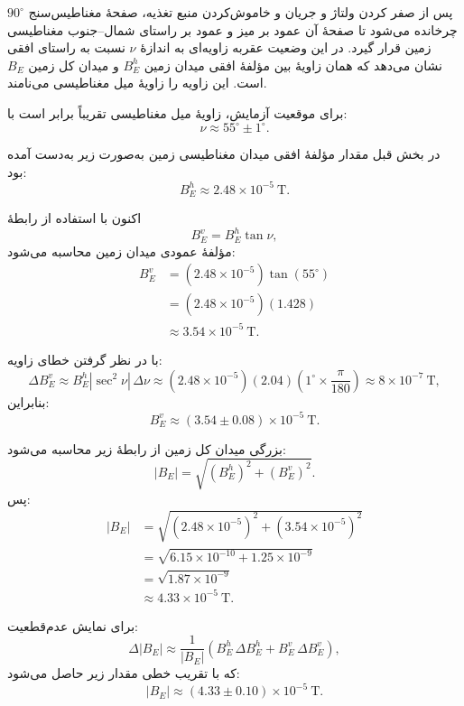 \documentclass[a4paper, 11pt]{article}
\begin{document}
پس از صفر کردن ولتاژ و جریان و خاموش‌کردن منبع تغذیه، صفحهٔ مغناطیس‌سنج
\(90^\circ\) چرخانده می‌شود تا صفحهٔ آن عمود بر میز و عمود بر راستای
شمال–جنوب مغناطیسی زمین قرار گیرد. در این وضعیت عقربه زاویه‌ای به اندازهٔ
\(\nu\) نسبت به راستای افقی نشان می‌دهد که همان زاویهٔ بین مؤلفهٔ افقی
میدان زمین \(B_E^h\) و میدان کل زمین \(B_E\) است. این زاویه را زاویهٔ
میل مغناطیسی می‌نامند.

برای موقعیت آزمایش، زاویهٔ میل مغناطیسی تقریباً برابر است با:
\begin{equation}
\nu \approx 55^\circ \pm 1^\circ.
\end{equation}

در بخش قبل مقدار مؤلفهٔ افقی میدان مغناطیسی زمین به‌صورت زیر به‌دست آمده بود:
\begin{equation}
B_E^h \approx 2.48\times 10^{-5}\ \mathrm{T}.
\end{equation}

اکنون با استفاده از رابطهٔ
\[
B_E^v = B_E^h \tan\nu,
\]
مؤلفهٔ عمودی میدان زمین محاسبه می‌شود:
\begin{align}
B_E^v
  &= \left(2.48\times 10^{-5}\right)\tan(55^\circ) \\[4pt]
  &= \left(2.48\times 10^{-5}\right)(1.428) \\[4pt]
  &\approx 3.54\times 10^{-5}\ \mathrm{T}.
\end{align}

با در نظر گرفتن خطای زاویه:
\[
\Delta B_E^v \approx B_E^h \left|\sec^2\nu\right|\,\Delta\nu
\approx (2.48\times 10^{-5})(2.04)(1^\circ\times\frac{\pi}{180})
\approx 8\times 10^{-7}\ \mathrm{T},
\]
بنابراین:
\[
B_E^v \approx (3.54 \pm 0.08)\times 10^{-5}\ \mathrm{T}.
\]

بزرگی میدان کل زمین از رابطهٔ زیر محاسبه می‌شود:
\[
\lvert B_E \rvert = \sqrt{(B_E^h)^2 + (B_E^v)^2}.
\]
پس:
\begin{align}
\lvert B_E \rvert
  &= \sqrt{(2.48\times 10^{-5})^2 + (3.54\times 10^{-5})^2} \\[4pt]
  &= \sqrt{6.15\times 10^{-10} + 1.25\times 10^{-9}} \\[4pt]
  &= \sqrt{1.87\times 10^{-9}} \\[4pt]
  &\approx 4.33\times 10^{-5}\ \mathrm{T}.
\end{align}

برای نمایش عدم‌قطعیت:
\[
\Delta |B_E| 
\approx 
\frac{1}{|B_E|}
\left(
B_E^h\,\Delta B_E^h + B_E^v\,\Delta B_E^v
\right),
\]
که با تقریب خطی مقدار زیر حاصل می‌شود:
\[
|B_E| \approx (4.33 \pm 0.10)\times 10^{-5}\ \mathrm{T}.
\]
\end{document}
